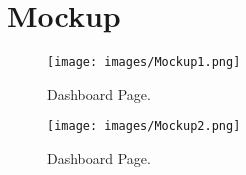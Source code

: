\section{Mockup}
\begin{figure*}[ht!]
    \centering
    \texttt{[image: images/Mockup1.png]}
    \caption{Dashboard Page.}
    \label{fig:my_label}
\end{figure*}
\begin{figure*}[ht!]
    \centering
    \texttt{[image: images/Mockup2.png]}
    \caption{Dashboard Page.}
    \label{fig:my_label}
\end{figure*}

